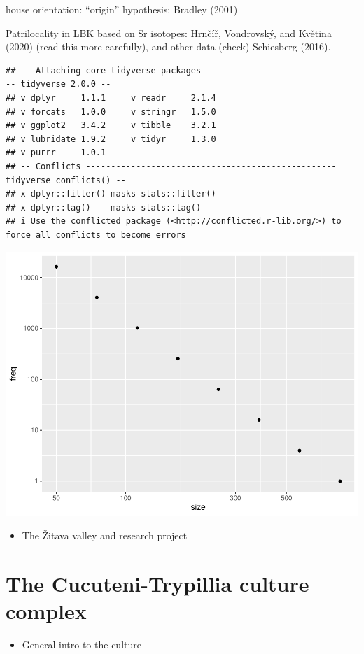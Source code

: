 \documentclass[
  12pt,
]{book}
\providecommand{\tightlist}{%
  \setlength{\itemsep}{0pt}\setlength{\parskip}{0pt}}
\begin{document}
house orientation: ``origin'' hypothesis: Bradley (2001)

Patrilocality in LBK based on Sr isotopes: Hrnčíř, Vondrovský, and Květina (2020) (read this more carefully), and other data (check) Schiesberg (2016).

\begin{verbatim}
## -- Attaching core tidyverse packages -------------------------------- tidyverse 2.0.0 --
## v dplyr     1.1.1     v readr     2.1.4
## v forcats   1.0.0     v stringr   1.5.0
## v ggplot2   3.4.2     v tibble    3.2.1
## v lubridate 1.9.2     v tidyr     1.3.0
## v purrr     1.0.1     
## -- Conflicts -------------------------------------------------- tidyverse_conflicts() --
## x dplyr::filter() masks stats::filter()
## x dplyr::lag()    masks stats::lag()
## i Use the conflicted package (<http://conflicted.r-lib.org/>) to force all conflicts to become errors
\end{verbatim}

\begin{center}\includegraphics[width=0.7\linewidth]{bookdown-demo_files/figure-latex/unnamed-chunk-1-1} \end{center}

\begin{itemize}
\tightlist
\item
  The Žitava valley and research project
\end{itemize}

\hypertarget{trypillia}{%
\section{The Cucuteni-Trypillia culture complex}\label{trypillia}}

\begin{itemize}
\tightlist
\item
  General intro to the culture
\end{itemize}
\end{document}
